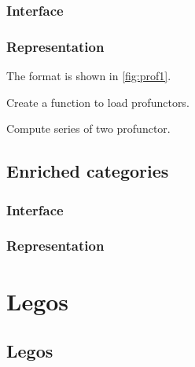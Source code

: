 \begin{exercise}
\label{sec:exercises-profunctors}

\subsection*{Interface}


\subsection*{Representation}

The format is shown in \cref{fig:prof1}.




\begin{exercise}
Create a function to load profunctors.

%

\end{exercise}


\begin{exercise}
Compute series of two profunctor.
%
\end{exercise}


\section{Enriched categories}

\subsection*{Interface}


\subsection*{Representation}


\chapter{Legos}
\label{ch:exercises-legos}


\section{Legos}


\end{exercise}
